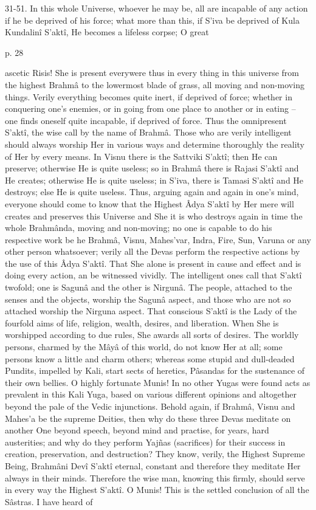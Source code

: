  

31-51. In this whole Universe, whoever he may be, all are incapable of any action if he be deprived of his force; what more than this, if S’iva be deprived of Kula Kundalinî S’aktî, He becomes a lifeless corpse; O great

 

p. 28

 

ascetic Risis! She is present everywere thus in every thing in this universe from the highest Brahmâ to the lowermost blade of grass, all moving and non-moving things. Verily everything becomes quite inert, if deprived of force; whether in conquering one's enemies, or in going from one place to another or in eating -- one finds oneself quite incapable, if deprived of force. Thus the omnipresent S’aktî, the wise call by the name of Brahmâ. Those who are verily intelligent should always worship Her in various ways and determine thoroughly the reality of Her by every means. In Visnu there is the Sattviki S’aktî; then He can preserve; otherwise He is quite useless; so in Brahmâ there is Rajasi S’aktî and He creates; otherwise He is quite useless; in S’iva, there is Tamasi S’aktî and He destroys; else He is quite useless. Thus, arguing again and again in one's mind, everyone should come to know that the Highest Âdya S’aktî by Her mere will creates and preserves this Universe and She it is who destroys again in time the whole Brahmânda, moving and non-moving; no one is capable to do his respective work be he Brahmâ, Visnu, Mahes'var, Indra, Fire, Sun, Varuna or any other person whatsoever; verily all the Devas perform the respective actions by the use of this Âdya S’aktî. That She alone is present in cause and effect and is doing every action, an be witnessed vividly. The intelligent ones call that S’aktî twofold; one is Sagunâ and the other is Nirgunâ. The people, attached to the senses and the objects, worship the Sagunâ aspect, and those who are not so attached worship the Nirguna aspect. That conscious S’aktî is the Lady of the fourfold aims of life, religion, wealth, desires, and liberation. When She is worshipped according to due rules, She awards all sorts of desires. The worldly persons, charmed by the Mâyâ of this world, do not know Her at all; some persons know a little and charm others; whereas some stupid and dull-deaded Pundits, impelled by Kali, start sects of heretics, Pâsandas for the sustenance of their own bellies. O highly fortunate Munis! In no other Yugas were found acts as prevalent in this Kali Yuga, based on various different opinions and altogether beyond the pale of the Vedic injunctions. Behold again, if Brahmâ, Visnu and Mahes’a be the supreme Deities, then why do these three Devas meditate on another One beyond speech, beyond mind and practise, for years, hard austerities; and why do they perform Yajñas (sacrifices) for their success in creation, preservation, and destruction? They know, verily, the Highest Supreme Being, Brahmâni Devî S’aktî eternal, constant and therefore they meditate Her always in their minds. Therefore the wise man, knowing this firmly, should serve in every way the Highest S’aktî. O Munis! This is the settled conclusion of all the Sâstras. I have heard of 